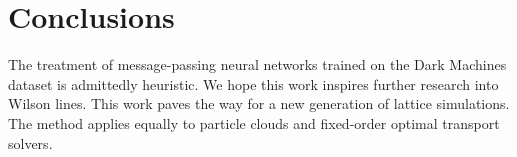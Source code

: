 \section{Conclusions}\label{sec:conclusions}

The treatment of message-passing neural networks trained on the Dark
Machines dataset is admittedly heuristic. We hope this work inspires
further research into Wilson lines. This work paves the way for a new
generation of lattice simulations. The method applies equally to
particle clouds and fixed-order optimal transport solvers.

